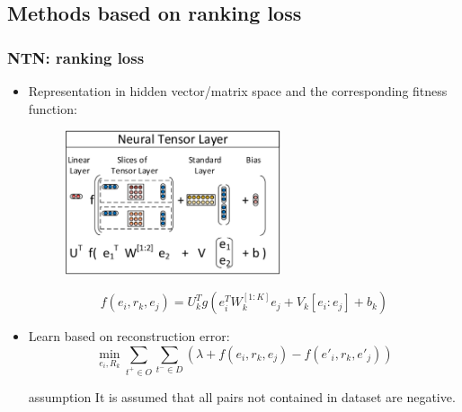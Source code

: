\documentclass[pdf,10pt]{beamer}
\begin{document}
\subsection{Methods based on ranking loss}
\begin{frame}
\frametitle{NTN: ranking loss}
\begin{itemize}
	\item Representation in hidden vector/matrix space and the corresponding fitness function:
		\begin{figure}
			\includegraphics[width=0.60\textwidth,height=0.30\textwidth]{7.eps}
		\end{figure}
		\begin{equation}
			f(e_i,r_k,e_j)=U_k^Tg(e_i^TW_k^{[1:K]}e_j + V_k[e_i:e_j] + b_k)
		\end{equation}
	\item Learn based on reconstruction error:
		\begin{equation}
			\min_{e_i,R_k}\sum_{t^+ \in O}\sum_{t^- \in D}{(\lambda + f(e_i,r_k,e_j) - f(e'_i,r_k,e'_j))}
		\end{equation}
	\begin{exampleblock}{assumption}
		It is assumed that all pairs not contained in dataset are negative.
	\end{exampleblock}
\end{itemize}
\end{frame}
\end{document}
